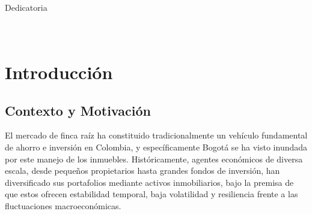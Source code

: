 \documentclass[12pt, a4paper, twoside, openright]{report}
\theoremstyle{plain}
\theoremstyle{definition}
\begin{document}
\thispagestyle{empty}
\cleardoublepage
\thispagestyle{empty}

\vspace*{\fill}
\begin{flushright}
    \begin{minipage}{0.65\textwidth}
        \begin{flushright}
            {\selectfont\Huge\color{mypurple} Dedicatoria}\\[2.5em]
            {\Large\itshape
            \phantom{Texto de dedicatoria. Reemplaza este párrafo}\\[0.8em]
            \phantom{por las palabras que quieras dedicar a las}\\[0.8em]
            \phantom{personas que te acompañaron en este camino.}
            }
        \end{flushright}
    \end{minipage}
\end{flushright}
\vspace*{\fill}

\cleardoublepage

\tableofcontents


\newcommand{\ratio}{\textit{ratio}}%

\chapter{Introducción}\label{ch:intro}
\section{Contexto y Motivación}

El mercado de finca raíz ha constituido tradicionalmente un vehículo fundamental de ahorro e inversión en Colombia, y específicamente Bogotá se ha visto inundada por este manejo de los inmuebles. Históricamente, agentes económicos de diversa escala, desde pequeños propietarios hasta grandes fondos de inversión, han diversificado sus portafolios mediante activos inmobiliarios, bajo la premisa de que estos ofrecen estabilidad temporal, baja volatilidad y resiliencia frente a las fluctuaciones macroeconómicas.
\end{document}
